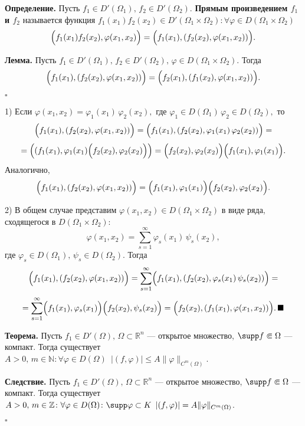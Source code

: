 \documentclass[12pt,a4paper,draft]{article}
\DeclareRobustCommand*{\т}{~--- }
\DeclareRobustCommand*{\ч}{~-- }
\begin{document}

\textbf{Определение.} Пусть $f_1\in D'(\Omega_1),\,f_2\in
D'(\Omega_2).$ \textbf{Прямым произведением $f_1$ и $f_2$}
называется функция $f_1(x_1)f_2(x_2)\in
D'(\Omega_1\times\Omega_2)\colon \forall\varphi \in
D(\Omega_1\times\Omega_2)$
$$\Bigl(f_1(x_1)f_2(x_2),\varphi(x_1,x_2)\Bigr)=\Bigl(f_1(x_1),(f_2(x_2),\varphi(x_1,x_2))\Bigr).$$

\textbf{Лемма.} Пусть $f_1\in D'(\Omega_1),\,f_2\in
D'(\Omega_2),\,\varphi \in D(\Omega_1\times\Omega_2).$ Тогда
$$\Bigl(f_1(x_1),(f_2(x_2),\varphi(x_1,x_2))\Bigr)=\Bigl(f_2(x_1),(f_1(x_2),\varphi(x_1,x_2))\Bigr).$$

$\square$

1) Если $\varphi(x_1,x_2)=\varphi_1(x_1)\,\varphi_2(x_2),$ где
$\varphi_1\in D(\Omega_1)\,\varphi_2\in D(\Omega_2),$ то
$$\Bigl(f_1(x_1),(f_2(x_2),\varphi(x_1,x_2))\Bigr)=
\Bigl(f_1(x_1),(f_2(x_2),\varphi_1(x_1)\,\varphi_2(x_2))\Bigr)=$$
$$=\left((f_1(x_1),\varphi_1(x_1)\Bigl(f_2(x_2),\varphi_2(x_2)\Bigr)\right)=
\Bigl(f_2(x_2),\varphi_2(x_2)\Bigr)\Bigl(f_1(x_1),\varphi_1(x_1)\Bigr).$$
Аналогично,
$$\Bigl(f_1(x_1),(f_2(x_2),\varphi(x_1,x_2))\Bigr)=
\Bigl(f_1(x_1),\varphi_1(x_1)\Bigr)\Bigl(f_2(x_2),\varphi_2(x_2)\Bigr).$$

2) В общем случае представим $\varphi(x_1,x_2)\in
D(\Omega_1\times\Omega_2)$ в виде ряда, сходящегося в
$D(\Omega_1\times\Omega_2)$:
$$\varphi(x_1,x_2)=\sum_{s=1}^{\infty}\varphi_s(x_1)\,\psi_s(x_2),$$
где $\varphi_s \in D(\Omega_1),\,\psi_s \in D(\Omega_2).$ Тогда
$$\Bigl(f_1(x_1),(f_2(x_2),\varphi(x_1,x_2))\Bigr)=
\sum_{s=1}^{\infty}\Bigl(f_1(x_1),(f_2(x_2),\varphi_s(x_1)\,\psi_s(x_2))\Bigr)=$$
$$=\sum_{s=1}^{\infty}\Bigl(f_1(x_1),\varphi_s(x_1)\Bigr)\Bigl(f_2(x_2),\psi_s(x_2)\Bigr)=
\Bigl(f_2(x_2),(f_1(x_1),\varphi(x_1,x_2))\Bigr).\,\blacksquare$$


\textbf{Теорема.} Пусть $f_1\in D'(\Omega),\,\Omega\subset\mathbb
R^n$ --- открытое множество, $\supp f\Subset\Omega$ --- компакт.
Тогда существует $A>0,\,m\in \mathbb N\colon \forall \varphi\in
D(\Omega)\,\,\,|(f,\varphi)|\le A\|\varphi\|_{C^m(\Omega)}$.

\textbf{Следствие.} Пусть $f_1\in
D'(\Omega),\,\Omega\subset\mathbb R^n$ --- открытое множество,
$\supp f\Subset\Omega$ --- компакт. Тогда существует $A>0,\,m\in
\mathbb Z\colon \forall \varphi\in D(\Omega)\colon \supp
\varphi\subset K \,\,\,|(f,\varphi)|= A\|\varphi\|_{C^m(\Omega)}$.

$\square$
\end{document}
